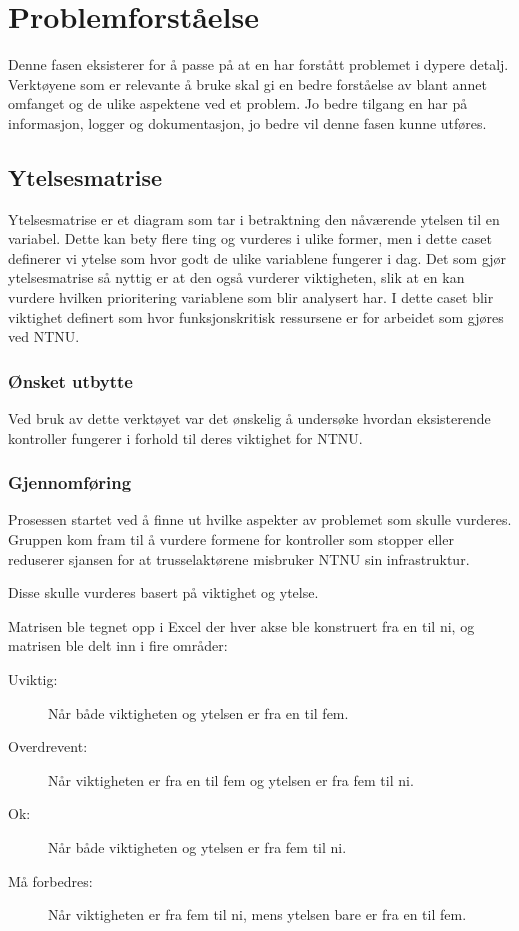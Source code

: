 \chapter{Problemforståelse}
Denne fasen eksisterer for å passe på at en har forstått problemet i dypere detalj. Verktøyene som er relevante å bruke skal gi en bedre forståelse av blant annet omfanget og de ulike aspektene ved et problem. Jo bedre tilgang en har på informasjon, logger og dokumentasjon, jo bedre vil denne fasen kunne utføres. 


\section{Ytelsesmatrise}
Ytelsesmatrise er et diagram som tar i betraktning den nåværende ytelsen til en variabel. Dette kan bety flere ting og vurderes i ulike former, men i dette caset definerer vi ytelse som hvor godt de ulike variablene fungerer i dag. Det som gjør ytelsesmatrise så nyttig er at den også vurderer viktigheten, slik at en kan vurdere hvilken prioritering variablene som blir analysert har. I dette caset blir viktighet definert som hvor funksjonskritisk ressursene er for arbeidet som gjøres ved NTNU.

\subsection{Ønsket utbytte}
Ved bruk av dette verktøyet var det ønskelig å undersøke hvordan eksisterende kontroller fungerer i forhold til deres viktighet for NTNU. 

\subsection{Gjennomføring}
Prosessen startet ved å finne ut hvilke aspekter av problemet som skulle vurderes. Gruppen kom fram til å vurdere formene for kontroller som stopper eller reduserer sjansen for at trusselaktørene misbruker NTNU sin infrastruktur. 

Disse skulle vurderes basert på viktighet og ytelse. 

Matrisen ble tegnet opp i Excel der hver akse ble konstruert fra en til ni, og matrisen ble delt inn i fire områder:
\begin{description}
    \item[Uviktig:] Når både viktigheten og ytelsen er fra en til fem.
    \item[Overdrevent:] Når viktigheten er fra en til fem og ytelsen er fra fem til ni.
    \item[Ok:] Når både viktigheten og ytelsen er fra fem til ni.
    \item[Må forbedres:] Når viktigheten er fra fem til ni, mens ytelsen bare er fra en til fem.
\end{description}

